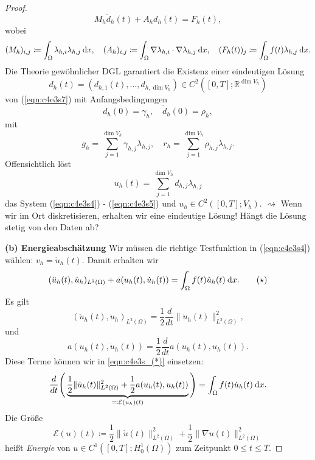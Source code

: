 \documentclass[../skript.tex]{subfiles}
\begin{document}
\begin{proof}
\begin{equation}
		M_h \ddot{d}_h(t) + A_h d_h(t) = F_h(t),
	\end{equation} 
	wobei 
	\[
		(M_h)_{i,j} \coloneqq \int_\Omega \lambda_{h,i}\lambda_{h,j}\:\mathrm{d}x,\quad (A_h)_{i,j} \coloneqq \int_\Omega \nabla\lambda_{h,i} \cdot \nabla\lambda_{h,j}\:\mathrm{d}x,\quad (F_h(t))_j \coloneqq \int_\Omega f(t)\lambda_{h,j} \:\mathrm{d}x.
	\]
	Die Theorie gewöhnlicher DGL garantiert die Existenz einer eindeutigen Lösung 
	\[
		d_h(t) = \left( d_{h,1}(t),...,d_{h,\dim{V_h}} \right) \in C^2([0,T];\mathbb{R}^{\dim{V_h}})
	\]
	von (\ref{eqn:c4e3s7}) mit Anfangsbedingungen 
	\begin{equation}\label{eqn:c4e3s8}
		 d_h(0) = \gamma_h,\quad\dot{d}_h(0) = \rho_h,
	\end{equation}
	mit 
	\[
		g_h = \sum_{j=1}^{\dim{V_h}} \gamma_{h,j}\lambda_{h,j},\quad r_h = \sum_{j=1}^{\dim{V_h}}\rho_{h,j}\lambda_{h,j}.
	\]
	Offensichtlich löst
	\[
		u_h(t) = \sum_{j=1}^{\dim{V_h}} d_{h,j}\lambda_{h,j}
	\]
	das System (\ref{eqn:c4e3s4}) - (\ref{eqn:c4e3s5}) und $u_h\in C^2([0,T];V_h)$.\newline\newline\noindent
	$\rightsquigarrow$ Wenn wir im Ort diskretisieren, erhalten wir eine eindeutige Lösung!\newline\newline\noindent
	Hängt die Lösung stetig von den Daten ab?\newline\newline\noindent

	\textbf{(b) Energieabschätzung  } Wir müssen die richtige Testfunktion in (\ref{eqn:c4e3s4}) wählen: $v_h = \dot{u}_h(t)$. Damit erhalten wir 
	\begin{equation}
		(\ddot{u}_h(t),\dot{u}_h)_{L^2(\Omega)} + a(u_h(t),\dot{u}_h(t)) = \int_\Omega f(t)\dot{u}_h(t)\:\mathrm{d}x.\label{eqn:c4e3s_(*)}\tag{$\star$}
	\end{equation}
	Es gilt
	\[
		(\ddot{u}_h(t),\dot{u}_h)_{L^2(\Omega)} = \frac{1}{2}\frac{d}{dt}\|\dot{u}_h(t)\|_{L^2(\Omega)}^2,
	\]
	und
	\[
		a(u_h(t),\dot{u}_h(t)) = \frac{1}{2}\frac{d}{dt} a(u_h(t),u_h(t)).	
	\]
	Diese Terme können wir in \eqref{eqn:c4e3s_(*)} einsetzen:
	\[
		\frac{d}{dt}\Bigg( \underbrace{\frac{1}{2}\|\dot{u}_h(t)\|_{L^2(\Omega)}^2 + \frac{1}{2}a(u_h(t), u_h(t))}_{\eqqcolon\mathcal{E}(u_h)(t)} \Bigg) = \int_\Omega f(t)\dot{u}_h(t)\:\mathrm{d}x.
	\]
	Die Größe
	\[
		\mathcal{E}(u)(t) \coloneqq \frac{1}{2}\|\dot{u}(t)\|_{L^2(\Omega)}^2 + \frac{1}{2}\|\nabla u(t)\|_{L^2(\Omega)}^2
	\]
	heißt \emph{Energie} von $u\in C^1([0,T];H^1_0(\Omega))$ zum Zeitpunkt $0\leq t\leq T$.


\end{proof}
\end{document}
